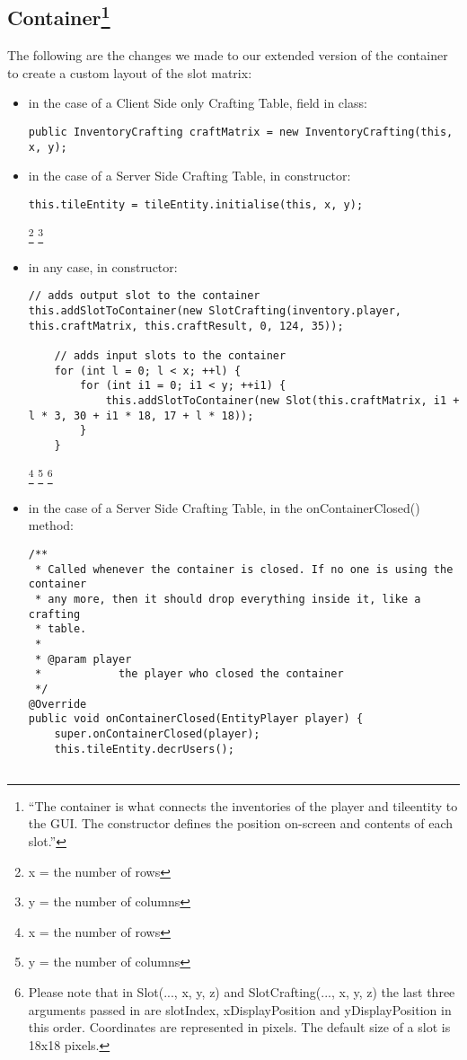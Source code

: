 \subsection[Container]{Container\footnote{``The container is what connects the inventories of the player and tileentity to the GUI. The constructor defines the position on-screen and contents of each slot.''\cite{website:forge-container}}}
The following are the changes we made to our extended version of the container to create a custom layout of the slot matrix:
\begin{itemize}

\item in the case of a Client Side only Crafting Table, field in class:
\begin{lstlisting}
public InventoryCrafting craftMatrix = new InventoryCrafting(this, x, y);
\end{lstlisting}

\item in the case of a Server Side Crafting Table, in constructor:
\begin{lstlisting}
this.tileEntity = tileEntity.initialise(this, x, y);
\end{lstlisting}

\let\thefootnote\relax\footnote{x = the number of rows}
\let\thefootnote\relax\footnote{y = the number of columns}

\item in any case, in constructor:
\begin{lstlisting}
// adds output slot to the container
this.addSlotToContainer(new SlotCrafting(inventory.player,	this.craftMatrix, this.craftResult, 0, 124, 35));

	// adds input slots to the container
	for (int l = 0; l < x; ++l) {
		for (int i1 = 0; i1 < y; ++i1) {
			this.addSlotToContainer(new Slot(this.craftMatrix, i1 + l * 3, 30 + i1 * 18, 17 + l * 18));
		}
	}
\end{lstlisting}

\let\thefootnote\relax\footnote{x = the number of rows}
\let\thefootnote\relax\footnote{y = the number of columns}
\let\thefootnote\relax\footnote{Please note that in Slot(..., x, y, z) and SlotCrafting(..., x, y, z) the last three arguments passed in are slotIndex, xDisplayPosition and yDisplayPosition in this order. Coordinates are represented in pixels. The default size of a slot is 18x18 pixels.}

\item in the case of a Server Side Crafting Table, in the onContainerClosed() method:
\begin{lstlisting}
/**
 * Called whenever the container is closed. If no one is using the container
 * any more, then it should drop everything inside it, like a crafting
 * table.
 *
 * @param player
 *            the player who closed the container
 */
@Override
public void onContainerClosed(EntityPlayer player) {
	super.onContainerClosed(player);
	this.tileEntity.decrUsers();


\end{lstlisting}
\end{itemize}
